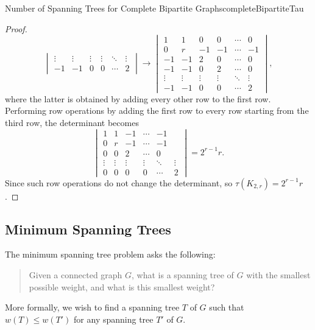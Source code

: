 \documentclass[math]{amznotes}
\theoremstyle{remark}
\begin{document}
\begin{probox}{Number of Spanning Trees for Complete Bipartite Graphs}{completeBipartiteTau}
\begin{proof}
\begin{equation*}
\begin{vmatrix}
                \vdots & \vdots & \vdots & \vdots & \ddots & \vdots \\
                -1 & -1 & 0 & 0 & \cdots & 2
            \end{vmatrix} \longrightarrow \begin{vmatrix}
                1 & 1 & 0 & 0 & \cdots & 0 \\
                0 & r & -1 & -1 & \cdots & -1 \\
                -1 & -1 & 2 & 0 & \cdots & 0 \\
                -1 & -1 & 0 & 2 & \cdots & 0 \\
                \vdots & \vdots & \vdots & \vdots & \ddots & \vdots \\
                -1 & -1 & 0 & 0 & \cdots & 2
            \end{vmatrix},
        \end{equation*}
        where the latter is obtained by adding every other row to the first row. Performing row operations by adding the first row to every row starting from the third row, the determinant becomes
        \begin{equation*}
            \begin{vmatrix}
                1 & 1 & -1 & \cdots & -1 \\
                0 & r & -1 & \cdots & -1 \\
                0 & 0 & 2 & \cdots & 0 \\
                \vdots & \vdots & \vdots & \vdots & \ddots & \vdots \\
                0 & 0 & 0 & 0 & \cdots & 2
            \end{vmatrix} = 2^{r - 1}r.
        \end{equation*}
        Since such row operations do not change the determinant, so $\tau(K_{2, r}) = 2^{r - 1}r$.
    \end{proof}
\end{probox}
\subsection{Minimum Spanning Trees}
The minimum spanning tree problem asks the following:
\begin{quote}
    Given a connected graph $G$, what is a spanning tree of $G$ with the smallest possible weight, and what is this smallest weight?
\end{quote}
More formally, we wish to find a spanning tree $T$ of $G$ such that $w(T) \leq w(T')$ for any spanning tree $T'$ of $G$.
\end{document}
